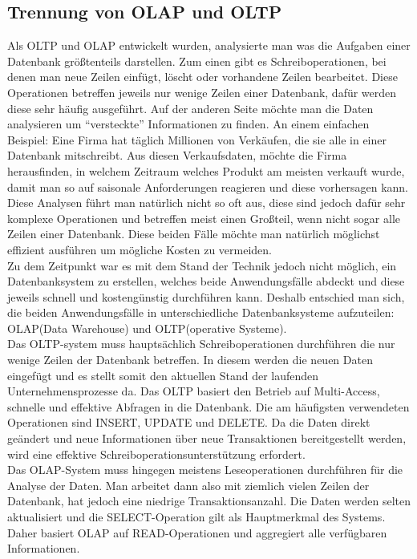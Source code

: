 \subsection{Trennung von OLAP und OLTP}
Als OLTP und OLAP entwickelt wurden, analysierte man was die Aufgaben einer Datenbank größtenteils darstellen. Zum einen gibt es Schreiboperationen, bei denen man neue Zeilen einfügt, löscht oder vorhandene Zeilen bearbeitet. Diese Operationen betreffen jeweils nur wenige Zeilen einer Datenbank, dafür werden diese sehr häufig ausgeführt. Auf der anderen Seite möchte man die Daten analysieren um “versteckte” Informationen zu finden. An einem einfachen Beispiel: Eine Firma hat täglich Millionen von Verkäufen, die sie alle in einer Datenbank mitschreibt. Aus diesen Verkaufsdaten, möchte die Firma herausfinden, in welchem Zeitraum welches Produkt am meisten verkauft wurde, damit man so auf saisonale Anforderungen reagieren und diese vorhersagen kann. Diese Analysen führt man natürlich nicht so oft aus, diese sind jedoch dafür sehr komplexe Operationen und betreffen meist einen Großteil, wenn nicht sogar alle Zeilen einer Datenbank.
Diese beiden Fälle möchte man natürlich möglichst effizient ausführen um mögliche Kosten zu vermeiden.
\\
Zu dem Zeitpunkt war es mit dem Stand der Technik jedoch nicht möglich, ein Datenbanksystem zu erstellen, welches beide Anwendungsfälle abdeckt und diese jeweils schnell und kostengünstig durchführen kann. Deshalb entschied man sich,
die beiden Anwendungsfälle in unterschiedliche Datenbanksysteme aufzuteilen: OLAP(Data Warehouse) und OLTP(operative Systeme).
\\
Das OLTP-system muss hauptsächlich Schreiboperationen durchführen die nur wenige Zeilen der Datenbank betreffen. In diesem werden die neuen Daten eingefügt und es stellt somit den aktuellen Stand der laufenden Unternehmensprozesse da. Das OLTP basiert den Betrieb auf Multi-Access, schnelle und effektive Abfragen in die Datenbank. Die am häufigsten verwendeten Operationen sind INSERT, UPDATE und DELETE. Da die Daten direkt geändert und neue Informationen über neue Transaktionen bereitgestellt werden, wird eine effektive Schreiboperationsunterstützung erfordert. 
\\
Das OLAP-System muss hingegen meistens Leseoperationen durchführen für die Analyse der Daten. Man arbeitet dann also mit ziemlich vielen Zeilen der Datenbank, hat jedoch eine niedrige Transaktionsanzahl. Die Daten werden selten aktualisiert und die SELECT-Operation gilt als Hauptmerkmal des Systems. Daher basiert OLAP auf READ-Operationen und aggregiert alle verfügbaren Informationen.
